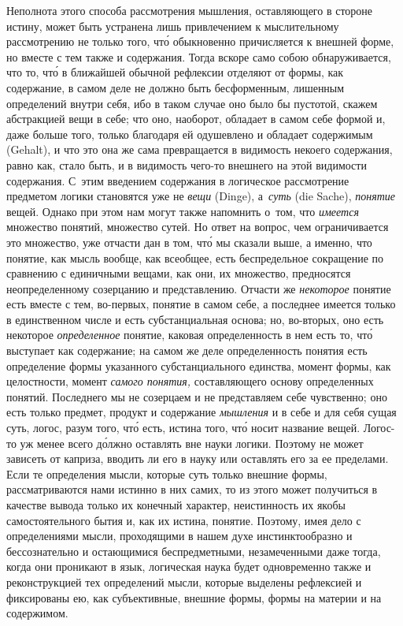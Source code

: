 Неполнота этого способа рассмотрения мышления, оставляющего в стороне истину,
может быть устранена лишь привлечением к мыслительному рассмотрению не только
того, чт\'{о} обыкновенно причисляется к внешней форме, но вместе с тем также и
содержания. Тогда вскоре само собою обнаруживается, что то, чт\'{о} в ближайшей
обычной рефлексии отделяют от формы, как содержание, в самом деле не должно
быть бесформенным, лишенным определений внутри себя, ибо в таком случае оно
было бы пустотой, скажем абстракцией вещи в себе; что оно, наоборот, обладает в
самом себе формой и, даже больше того, только благодаря ей одушевлено и
обладает содержимым (Gehalt), и что это она же сама превращается в видимость
некоего содержания, равно как, стало быть, и в видимость чего-то внешнего на
этой видимости содержания. С~этим введением содержания в логическое
рассмотрение предметом логики становятся уже не {\em вещи} (Dinge),
а~{\em суть} (die Sache), {\em понятие} вещей. Однако при этом нам могут также
напомнить о~том, что {\em имеется} множество понятий, множество сутей. Но ответ
на вопрос, чем ограничивается это множество, уже отчасти дан в том, чт\'{о} мы
сказали выше, а именно, что понятие, как мысль вообще, как всеобщее, есть
беспредельное сокращение по сравнению с единичными вещами, как они, их
множество, предносятся неопределенному созерцанию и представлению. Отчасти же
{\em некоторое} понятие есть вместе с тем, во-первых, понятие в самом себе, а
последнее имеется только в единственном числе и есть субстанциальная основа;
но, во-вторых, оно есть некоторое {\em определенное} понятие, каковая
определенность в нем есть то, чт\'{о} выступает как содержание; на самом же
деле определенность понятия есть определение формы указанного субстанциального
единства, момент формы, как целостности, момент {\em самого понятия,}
составляющего основу определенных понятий. Последнего мы не созерцаем и не
представляем себе чувственно; оно есть только предмет, продукт и содержание
{\em мышления} и в себе и для себя сущая суть, логос, разум того, чт\'{о} есть,
истина того, чт\'{о} носит название вещей. Логос-то уж менее всего д\'{о}лжно
оставлять вне науки логики. Поэтому не может зависеть от каприза, вводить ли
его в науку или оставлять его за ее пределами. Если те определения мысли,
которые суть только внешние формы, рассматриваются нами истинно в них самих, то
из этого может получиться в качестве вывода только их конечный характер,
неистинность их якобы самостоятельного бытия и, как их истина, понятие.
Поэтому, имея дело с определениями мысли, проходящими в нашем духе
инстинктообразно и бессознательно и остающимися беспредметными, незамеченными
даже тогда, когда они проникают в язык, логическая наука будет одновременно
также и реконструкцией тех определений мысли, которые выделены рефлексией и
фиксированы ею, как субъективные, внешние формы, формы на материи и на
содержимом.


